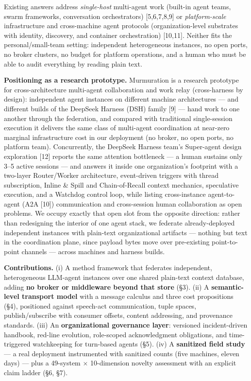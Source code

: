 \documentclass[journal]{IEEEtran}
\begin{document}
Existing answers address \emph{single-host} multi-agent work (built-in
agent teams, swarm frameworks, conversation orchestrators)
{[}5,6,7,8,9{]} or \emph{platform-scale} infrastructure and
cross-machine agent protocols (organization-level substrates with
identity, discovery, and container orchestration) {[}10,11{]}. Neither
fits the personal/small-team setting: independent heterogeneous
instances, no open ports, no broker clusters, no budget for platform
operations, and a human who must be able to audit everything by reading
plain text.

\textbf{Positioning as a research prototype.} Murmuration is a research
prototype for cross-architecture multi-agent collaboration and work
relay (cross-harness by design): independent agent instances on
different machine architectures --- and different builds of the DeepSeek
Harness (DSH) family {[}9{]} --- hand work to one another through the
federation, and compared with traditional single-session execution it
delivers the same class of multi-agent coordination at near-zero
marginal infrastructure cost in our deployment (no broker, no open
ports, no platform team). Concurrently, the DeepSeek Harness team's
Super-agent design exploration {[}12{]} reports the same attention
bottleneck --- a human sustains only 3--5 active sessions --- and
answers it inside one organization's footprint with a two-layer
Router/Worker architecture, event-driven triggers with thread
subscription, Inline \& Spill and Chain-of-Recall context mechanics,
speculative execution, and a Watchdog control loop, while listing
cross-instance agent-to-agent (A2A {[}10{]}) communication and
cross-session human collaboration as open problems. We occupy exactly
that open slot from the opposite direction: rather than redesigning the
interior of one agent stack, we federate already-deployed independent
instances with plain-text organizational artifacts --- nothing but text
in the coordination plane, since payload bytes move over pre-existing
point-to-point channels --- across machines and harness builds.

\textbf{Contributions.} (i) A method framework that federates
independent, heterogeneous LLM-agent instances over one shared
plain-text context database, adding \textbf{no broker or middleware
beyond that store} (§3). (ii) A \textbf{semantic-level transport model}
with a message calculus and three cost propositions (§4), positioned
against speech-act communication, tuple spaces, publish/subscribe with
consumer offsets, content addressing, and provenance standards. (iii) An
\textbf{organizational governance layer}: versioned incident-driven
handbook, red-line evolution, role-scoped acknowledgment obligations,
and time-triggered watchkeeping for turn-based agents (§5). (iv) A
\textbf{sanitized field study} --- a real deployment instrumented with
sanitized counts (five machines, eleven days) --- plus a 49-system ×
10-dimension novelty assessment with an explicit claim ladder (§6, §7).
\end{document}

